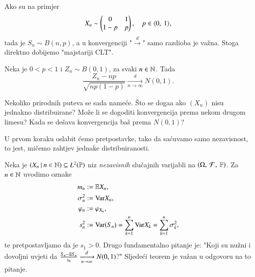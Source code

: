 Ako su na primjer
\begin{equation*}
    X_n \sim
    \begin{pmatrix}
        0 & 1\\
        1 - p & p
    \end{pmatrix},
    \quad p \in \langle {0}, \: {1} \rangle,
\end{equation*}
tada je $S_n \sim B (n, p)$, a u konvergenciji "$\xrightarrow{d}$" samo razdioba je va\v zna.
Stoga direktno dobijemo "majstariji CLT".

\begin{kor}  \label{kor:19.2}
    Neka je $0 < p < 1$ i $Z_n \sim B (0, 1)$, za svaki $n \in \mathbb{N}$.
    Tada
    \begin{equation*}
        \frac{Z_n - n p}{\sqrt{n p (1 - p)}} \xrightarrow[n \to \infty]{d} N (0, 1).
    \end{equation*}
\end{kor}

\begin{nap} \label{nap:19.3}
    Nekoliko prirodnih puteva se sada name\' ce.
    \v Sto se doga\dj a ako $(X_n)$ nisu jednakno distribuirane?
    Mo\v ze li se dogoditi konvergencija prema nekom drugom limesu?
    Kada se de\v sava konvergencija ba\v s prema $N(0, 1)$?
\end{nap}

U prvom koraku oslabit \' cemo pretpostavke, tako da sa\' cuvamo samo nezavisnost, to jest, mi\v cemo zahtjev jednake distribuiranosti.

Neka je $({X_n} \: | \: {n \in \mathbb{N}}) \subseteq L^2 (\mathbb{P})$ niz \emph{nezavisnih} slu\v cajnih varijabli na $(\Omega, \: \mathcal{F}, \: \mathbb{P})$.
Za $n \in \mathbb{N}$ uvodimo oznake
\begin{equation*}
    \begin{aligned}
        m_n &:= \mathbb{E} X_n,\\
        \sigma^2_n &:= \mathrm{Var} X_n,\\
        \varphi_n &:= \varphi_{X_n},\\
        s^2_n &:= \mathrm{Var} (S_n) = \sum\limits_{k = 1}^{n} \mathrm{Var} X_k = \sum\limits_{k = 1}^{n} \sigma^2_k,
    \end{aligned}
\end{equation*}
te pretpostavljamo da je $s_1 > 0$.
Drugo fundamentalno pitanje je: "Koji su nu\v zni i dovoljni uvjeti
da $\frac{S_n - \mathbb{E} S_n}{s_n} \xrightarrow[n \to \infty]{d} N(0, 1)$?"
Sljede\' ci teorem je va\v zan u odgovoru na to pitanje.